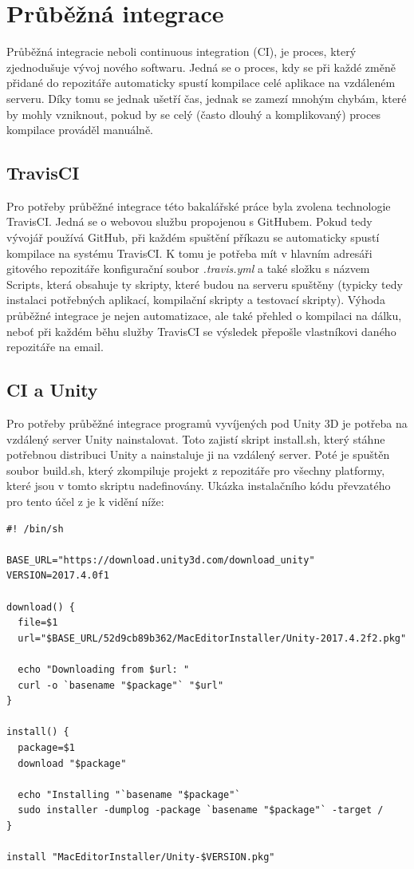 \documentclass[thesis=B,czech]{FITthesis}[2012/06/26]
\begin{document}
	\section{Průběžná integrace}
	Průběžná integracie neboli continuous integration (CI), je proces, který zjednodušuje vývoj nového softwaru. Jedná se o proces, kdy se při každé změně přidané do repozitáře automaticky spustí kompilace celé aplikace na vzdáleném serveru. Díky tomu se jednak ušetří čas, jednak se zamezí mnohým chybám, které by mohly vzniknout, pokud by se celý (často dlouhý a komplikovaný) proces kompilace prováděl manuálně.
	
	\subsection{TravisCI}
Pro potřeby průběžné integrace této bakalářské práce byla zvolena technologie TravisCI. Jedná se o webovou službu propojenou s GitHubem. Pokud tedy vývojář používá GitHub, při každém spuštění příkazu  se automaticky spustí kompilace na systému TravisCI. K tomu je potřeba mít v hlavním adresáři gitového repozitáře konfigurační soubor \emph{.travis.yml} a také složku s názvem Scripts, která obsahuje ty skripty, které budou na serveru spuštěny (typicky tedy instalaci potřebných aplikací, kompilační skripty a testovací skripty). Výhoda průběžné integrace je nejen automatizace, ale také přehled o kompilaci na dálku, neboť při každém běhu služby TravisCI se výsledek přepošle vlastníkovi daného repozitáře na email.

\subsection{CI a Unity}
Pro potřeby průběžné integrace programů vyvíjených pod Unity 3D je potřeba na vzdálený server Unity nainstalovat. Toto zajistí skript install.sh, který stáhne potřebnou distribuci Unity a nainstaluje ji na vzdálený server. Poté je spuštěn soubor build.sh, který zkompiluje projekt z repozitáře pro všechny platformy, které jsou v tomto skriptu nadefinovány. Ukázka instalačního kódu převzatého pro tento účel z \cite{travis} je k vidění níže:

\begin{lstlisting}[frame=single]
#! /bin/sh

BASE_URL="https://download.unity3d.com/download_unity"
VERSION=2017.4.0f1

download() {
  file=$1
  url="$BASE_URL/52d9cb89b362/MacEditorInstaller/Unity-2017.4.2f2.pkg"

  echo "Downloading from $url: "
  curl -o `basename "$package"` "$url"
}

install() {
  package=$1
  download "$package"

  echo "Installing "`basename "$package"`
  sudo installer -dumplog -package `basename "$package"` -target /
}

install "MacEditorInstaller/Unity-$VERSION.pkg"
\end{lstlisting}
\end{document}

